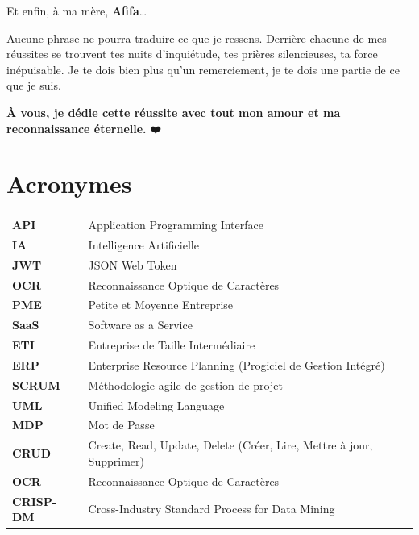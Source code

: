 \begin{center}
\vspace{0.3cm}

Et enfin, à ma mère, \textbf{Afifa}…

Aucune phrase ne pourra traduire ce que je ressens. Derrière chacune de mes réussites se trouvent tes nuits d’inquiétude, tes prières silencieuses, ta force inépuisable. Je te dois bien plus qu’un remerciement, je te dois une partie de ce que je suis.

\vspace{0.3cm}

\textbf{À vous, je dédie cette réussite avec tout mon amour et ma reconnaissance éternelle.} ❤️

\end{center}

\clearpage

\tableofcontents
\clearpage
\listoffigures
\clearpage
\listoftables
\clearpage

\chapter*{Acronymes}
\begin{tabular}{ll}
\textbf{API} & Application Programming Interface \\
\textbf{IA} & Intelligence Artificielle \\
\textbf{JWT} & JSON Web Token \\
\textbf{OCR} & Reconnaissance Optique de Caractères \\
\textbf{PME} & Petite et Moyenne Entreprise \\
\textbf{SaaS} & Software as a Service \\
\textbf{ETI} & Entreprise de Taille Intermédiaire \\
\textbf{ERP} & Enterprise Resource Planning (Progiciel de Gestion Intégré) \\
\textbf{SCRUM} & Méthodologie agile de gestion de projet \\
\textbf{UML} & Unified Modeling Language \\
\textbf{MDP} & Mot de Passe \\
\textbf{CRUD} & Create, Read, Update, Delete (Créer, Lire, Mettre à jour, Supprimer) \\
\textbf{OCR} & Reconnaissance Optique de Caractères \\
\textbf{CRISP-DM} & Cross-Industry Standard Process for Data Mining \\


\end{tabular}

